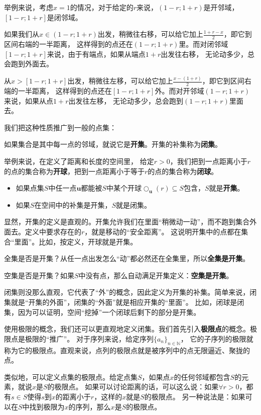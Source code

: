 \documentclass[12pt,UTF8,fontset=none]{ctexbook}
\begin{document}
举例来说，考虑$x=1$的情况，对于给定的$r$来说，$(1-r;1+r)$是开邻域，$[1-r;1+r]$是闭邻域。

如果我们从$x\in(1-r;1+r)$出发，稍微往右移，可以给它加上$\frac{1+r-x}{2}$，即它到区间右端的一半距离，
这样得到的点还在$(1-r;1+r)$里。而对闭邻域$[1-r;1+r]$来说，由于有端点，如果从端点$1+r$出发往右移，
无论动多少，总会跑到外面去。

从$x>[1-r;1+r]$出发，稍微往左移，可以给它加上$\frac{x-(1+r)}{2}$，即它到区间右端的一半距离，
这样得到的点还在$[1-r;1+r]$外。而对开邻域$(1-r;1+r)$来说，如果从点$1+r$出发往左移，
无论动多少，总会跑到$(1-r;1+r)$里面去。

我们把这种性质推广到一般的点集：
\begin{df}
    如果集合是其中每一点的邻域，就说它是\textbf{开集}。开集的补集称为\textbf{闭集}。
\end{df}

举例来说，在定义了距离和长度的空间里，
给定$r>0$，我们把到一点距离小于$r$的点的集合称为\textbf{开球}，把到一点距离小于等于$r$的点的集合称为\textbf{闭球}。
\begin{itemize}
    \item 如果点集$S$中任一点$\mathbf{u}$都能被$S$中某个开球$\bigcirc_{\mathbf{u}}(r)\subseteq S$包含，$S$就是\textbf{开集}。
    \item 如果$S$在空间中的补集是开集，$S$就是闭集。
\end{itemize}

显然，开集的定义是直观的。开集允许我们在里面“稍微动一动”，而不跑到集合外面去。定义中要求存在的$r$，就是移动的“安全距离”。
这说明开集中的点都在集合“里面”。比如，按定义，开球就是开集。

全集是否是开集？从任一点出发怎么“动”都必然还在全集里，所以\textbf{全集是开集}。

空集是否是开集？如果$S$中没有点，那么自动满足开集定义：\textbf{空集是开集}。

闭集则没那么直观，它代表了“外”的概念，因此定义为开集的补集。简单来说，闭集就是“开集的外面”，闭集的“外面”就是相应开集的“里面”。
比如，闭球是闭集，因为可以证明，空间“挖掉”一个闭球后剩下的部分是开集。

使用极限的概念，我们还可以更直观地定义闭集。我们首先引入\textbf{极限点}的概念。极限点是极限的“推广”。
对于序列来说，给定序列$\{a_n\}_{n\in\mathbb{N}}$，
它的子序列的极限就称为它的极限点。直观来说，点列的极限点就是被序列中的点无限逼近、聚拢的点。

类似地，可以定义点集的极限点。给定点集$S$，如果点$x$的任何邻域都包含$S$的元素，就说$x$是$S$的极限点。
如果可以讨论距离的话，可以这么说：如果$\forall r>0$，都有$s\in S$使得$s$到$x$的距离小于$r$，这样的$x$就是$S$的极限点。
另一种说法是：如果可以在$S$中找到极限为$x$的序列，那么$x$是$S$的极限点。
\end{document}
